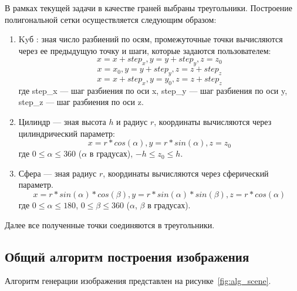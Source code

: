 В рамках текущей задачи в качестве граней выбраны треугольники.
Построение полигональной сетки осуществляется следующим образом:
\begin{enumerate}
	\item Kyб : зная число разбиений по осям, промежуточные точки вычисляются через ее предыдущую точку и шаги, которые задаются пользователем:
	\begin{equation}
		x = x + step_x, y = y + step_y, z = z_0
	\end{equation}
	\begin{equation}
		x = x_0, y = y + step_y, z = z + step_z
	\end{equation}
	\begin{equation}
		x = x + step_x, y = y_0, z = z + step_z
	\end{equation}
	где step\_x --- шаг разбиения по оси x, step\_y --- шаг разбиения по оси y, step\_z --- шаг разбиения по оси z.
	\item Цилиндр --- зная высота ${h}$ и радиус ${r}$, координаты вычисляются через цилиндрический параметр:
	\begin{equation}
		x = r * cos(\alpha), y = r * sin(\alpha), z = z_0
	\end{equation}
	где $0 \leqslant \alpha \leqslant 360$ ($\alpha$ в градусах), $-h \leqslant z_0 \leqslant h$.
	
	\item Сфера --- зная радиус ${r}$, координаты вычисляются через сферический параметр.
	\begin{equation}
		x = r * sin(\alpha) * cos(\beta), y = r * sin(\alpha) * sin(\beta), z = r * cos(\alpha)
	\end{equation}
	где $0 \leqslant \alpha \leqslant 180$, $0 \leqslant \beta \leqslant 360$ ($\alpha$, $\beta$ в градусах).
\end{enumerate}
Далее все полученные точки соединяются в треугольники.
\subsection{Общий алгоритм построения изображения}

Алгоритм генерации изображения представлен на рисунке~\ref{fig:alg_scene}.


